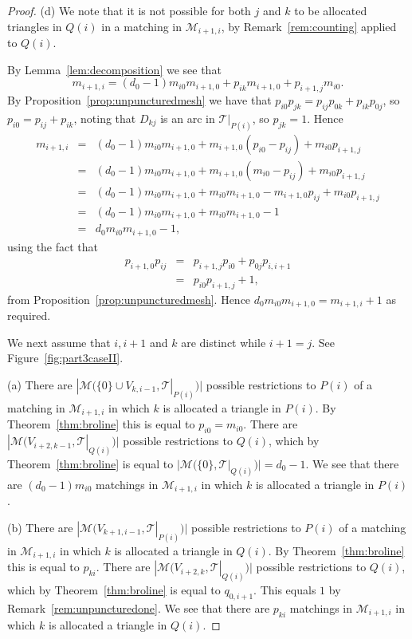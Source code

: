 \documentclass[a4paper]{amsart}
\begin{document}
\begin{proof}
(d) We note that it is not possible for both $j$ and $k$ to be allocated
triangles in $Q(i)$ in a matching in ${\mathcal M}_{i+1,i}$,
by Remark~\ref{rem:counting} applied to $Q(i)$.

By Lemma~\ref{lem:decomposition} we see that
$$m_{i+1,i}=(d_0-1)m_{i0}m_{i+1,0}+p_{ik}m_{i+1,0}+p_{i+1,j}m_{i0}.$$
By Proposition~\ref{prop:unpuncturedmesh} we have that
$p_{i0}p_{jk}=p_{ij}p_{0k}+
p_{ik}p_{0j}$, so $p_{i0}=p_{ij}+p_{ik}$, noting that $D_{kj}$ is an arc
in ${\mathcal T}|_{P(i)}$, so $p_{jk}=1$. Hence
\begin{eqnarray*}
m_{i+1,i} &=& 
(d_0-1)m_{i0}m_{i+1,0}+ m_{i+1,0}(p_{i0}-p_{ij})+m_{i0}p_{i+1,j} \\
&=&
(d_0-1)m_{i0}m_{i+1,0}+ m_{i+1,0}(m_{i0}-p_{ij})+m_{i0}p_{i+1,j} \\
&=&
(d_0-1)m_{i0}m_{i+1,0}+ m_{i0}m_{i+1,0}-m_{i+1,0}p_{ij}+m_{i0}p_{i+1,j} \\
&=&
(d_0-1)m_{i0}m_{i+1,0}+ m_{i0}m_{i+1,0}-1 \\
&=&
d_0m_{i0}m_{i+1,0}-1,
\end{eqnarray*}
using the fact that
\begin{eqnarray*}
p_{i+1,0}p_{ij} &=& p_{i+1,j}p_{i0}+p_{0j}p_{i,i+1} \\
&=& p_{i0}p_{i+1,j}+1,
\end{eqnarray*}
from Proposition~\ref{prop:unpuncturedmesh}.
Hence $d_0m_{i0}m_{i+1,0}=m_{i+1,i}+1$ as required.

We next assume that $i,i+1$ and $k$ are distinct while $i+1=j$.
See Figure~\ref{fig:part3caseII}.

(a) There are $|{\mathcal M}(\{0\}\cup V_{k,i-1},{\mathcal T}|_{P(i)})|$
possible restrictions to $P(i)$ of a matching in ${\mathcal M}_{i+1,i}$
in which $k$ is allocated a triangle in $P(i)$.
By Theorem~\ref{thm:broline} this is equal to $p_{i0}=m_{i0}$.
There are $|{\mathcal M}(V_{i+2,k-1},{\mathcal T}|_{Q(i)})|$ possible restrictions to $Q(i)$,
which by Theorem~\ref{thm:broline} is equal to
$|{\mathcal M}(\{0\},{\mathcal T}|_{Q(i)})|=d_0-1$.
We see that there are $(d_0-1)m_{i0}$ matchings in ${\mathcal M}_{i+1,i}$
in which $k$ is allocated a triangle in $P(i)$.

(b) There are $|{\mathcal M}(V_{k+1,i-1},{\mathcal T}|_{P(i)})|$ possible restrictions to $P(i)$
of a matching in ${\mathcal M}_{i+1,i}$ in which $k$ is allocated a triangle in $Q(i)$.
By Theorem~\ref{thm:broline} this is equal to $p_{ki}$.
There are $|{\mathcal M}(V_{i+2,k},{\mathcal T}|_{Q(i)})|$ possible restrictions to $Q(i)$,
which by Theorem~\ref{thm:broline} is equal to $q_{0,i+1}$. This
equals $1$ by Remark~\ref{rem:unpuncturedone}.
We see that there are $p_{ki}$ matchings in ${\mathcal M}_{i+1,i}$ in which $k$
is allocated a triangle in $Q(i)$.


\end{proof}
\end{document}
